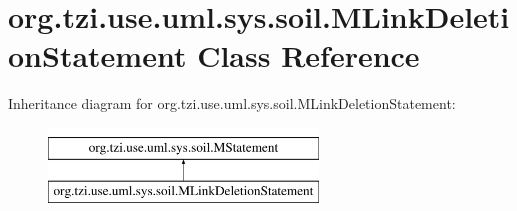 \hypertarget{classorg_1_1tzi_1_1use_1_1uml_1_1sys_1_1soil_1_1_m_link_deletion_statement}{\section{org.\-tzi.\-use.\-uml.\-sys.\-soil.\-M\-Link\-Deletion\-Statement Class Reference}
\label{classorg_1_1tzi_1_1use_1_1uml_1_1sys_1_1soil_1_1_m_link_deletion_statement}
}
Inheritance diagram for org.\-tzi.\-use.\-uml.\-sys.\-soil.\-M\-Link\-Deletion\-Statement\-:\begin{figure}[H]
\begin{center}
\leavevmode
\includegraphics[height=2.000000cm]{classorg_1_1tzi_1_1use_1_1uml_1_1sys_1_1soil_1_1_m_link_deletion_statement}
\end{center}
\end{figure}
